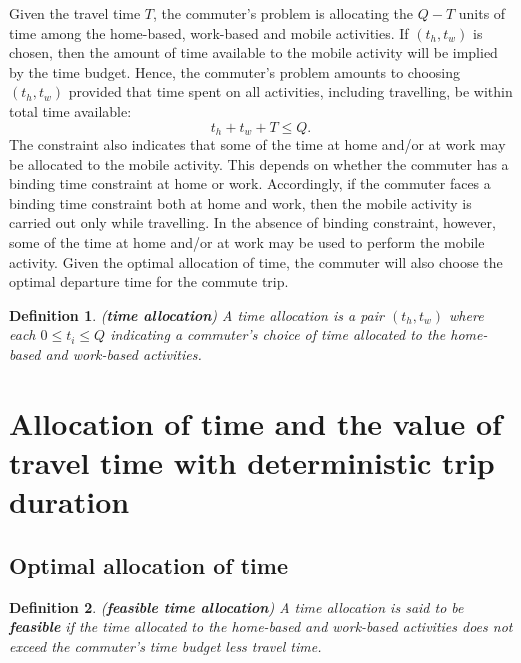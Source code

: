 \documentclass[12pt,a4paper,british]{article}
\newtheorem{definition}{Definition}[section]
\begin{document}
Given the travel time $T$, the commuter's problem is allocating the $Q-T$ units of time among the home-based, work-based and mobile activities. If $\left(t_{h},t_{w}\right)$ is chosen, then the amount of time available to the mobile activity will be implied by the time budget. Hence, the commuter's problem amounts to choosing $\left(t_{h},t_{w}\right)$ provided that time spent on all activities, including travelling, be within total time available:  
\begin{equation}
t_{h}+t_{w}+T\leq Q.
\label{constraint0}
\end{equation}
The constraint also indicates that some of the time at home and/or at work may be allocated to the mobile activity. This depends on whether the commuter has a binding time constraint at home or work. Accordingly, if the commuter faces a binding time constraint both at home and work, then the mobile activity is carried out only while travelling. In the absence of binding constraint, however, some of the time at home and/or at work may be used to perform the mobile activity. Given the optimal allocation of time, the commuter will also choose the optimal departure time for the commute trip.


\begin{definition}
(\textbf{time allocation}) A time allocation is a pair $\left(t_{h},t_{w}\right)$ where each $0\leq t_{i}\leq Q$ indicating a commuter's choice of time allocated to the home-based and work-based activities.
\end{definition}


\section{Allocation of time and the value of travel time with deterministic trip duration}

\subsection{Optimal allocation of time}
\begin{definition}
(\textbf{feasible time allocation}) A time allocation is said to be \textbf{\textit{feasible}} if the time allocated to the home-based and work-based activities does not exceed the commuter's time budget less travel time.
\end{definition}
\end{document}
